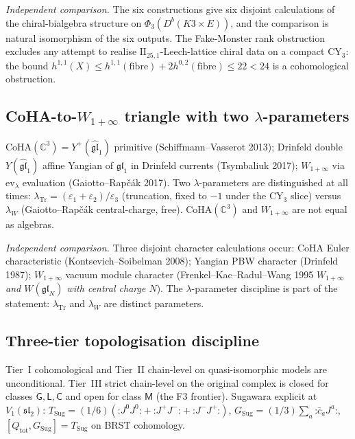 \noindent\emph{Independent comparison.} The six constructions give
six disjoint calculations of the chiral-bialgebra structure on
\(\Phi_3(D^b(K3\times E))\), and the comparison is natural
isomorphism of the six outputs. The Fake-Monster rank obstruction
excludes any attempt to realise \(\mathrm{II}_{25,1}\)-Leech-lattice chiral data on
a compact CY\(_3\): the bound
\(h^{1,1}(X) \le h^{1,1}(\mathrm{fibre}) + 2h^{0,2}(\mathrm{fibre}) \le 22 < 24\)
is a cohomological obstruction.

\subsection{CoHA-to-\texorpdfstring{\(W_{1+\infty}\)}{W1+inf} triangle with two
\texorpdfstring{\(\lambda\)}{lambda}-parameters}
\label{v4-subsec:coha-triangle-two-lambda}

\(\mathrm{CoHA}(\mathbb{C}^3) = Y^+(\hat{\mathfrak{gl}}_1)\) primitive (Schiffmann--Vasserot
2013); Drinfeld double \(Y(\hat{\mathfrak{gl}}_1)\) affine Yangian of
\(\mathfrak{gl}_1\) in Drinfeld currents (Tsymbaliuk 2017);
\(W_{1+\infty}\) via \(\mathrm{ev}_\lambda\) evaluation (Gaiotto--Rap\v c\'ak
2017). Two \(\lambda\)-parameters are distinguished at all times:
\(\lambda_{\mathrm{Tr}} = (\varepsilon_1+\varepsilon_2)/\varepsilon_3\)
(truncation, fixed to \(-1\) under the CY\(_3\) slice) versus \(\lambda_W\)
(Gaiotto--Rap\v c\'ak central-charge, free). \(\mathrm{CoHA}(\mathbb{C}^3)\)
and \(W_{1+\infty}\) are not equal as algebras.

\noindent\emph{Independent comparison.} Three disjoint character
calculations occur:
CoHA Euler characteristic (Kontsevich--Soibelman 2008); Yangian PBW
character (Drinfeld 1987); \(W_{1+\infty}\) vacuum module character
(Frenkel--Kac--Radul--Wang 1995 \textit{\(W_{1+\infty}\) and
\(W(\mathfrak{gl}_N)\) with central charge \(N\)}). The
\(\lambda\)-parameter discipline is part of the statement:
\(\lambda_{\mathrm{Tr}}\) and \(\lambda_W\) are distinct parameters.

\subsection{Three-tier topologisation discipline}
\label{v4-subsec:three-tier-topologisation}

Tier~I cohomological and Tier~II chain-level on quasi-isomorphic
models are unconditional. Tier~III strict chain-level on the original
complex is closed for classes \(\mathsf G, \mathsf L, \mathsf C\) and
open for class \(\mathsf M\) (the F3 frontier). Sugawara explicit at
\(V_1(\mathfrak{sl}_2)\):
\(T_{\mathrm{Sug}} = (1/6)(\mathord{:}J^0J^0\mathord{:}
+ \mathord{:}J^+J^-\mathord{:} + \mathord{:}J^-J^+\mathord{:})\),
\(G_{\mathrm{Sug}} = (1/3)\sum_a \mathord{:}\bar c_a J^a \mathord{:}\),
\([Q_{\mathrm{tot}}, G_{\mathrm{Sug}}] = T_{\mathrm{Sug}}\) on BRST
cohomology.

